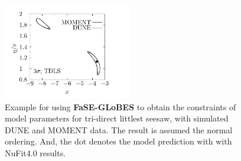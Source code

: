 \documentclass[aps,prd,nofootinbib,preprint]{revtex4}
\begin{document}
\begin{figure}[!h]
 \centering
\hspace{15mm}\includegraphics[width=0.5\textwidth]{figs/x_eta.pdf}
   \caption{\label{fig:constraint}Example for using \textbf{FaSE-GLoBES} to obtain the constraints of model parameters for tri-direct littlest seesaw, with simulated DUNE and MOMENT data. The result is assumed the normal ordering. And, the dot denotes the model prediction with with NuFit4.0 results.}
\end{figure}
\end{document}
